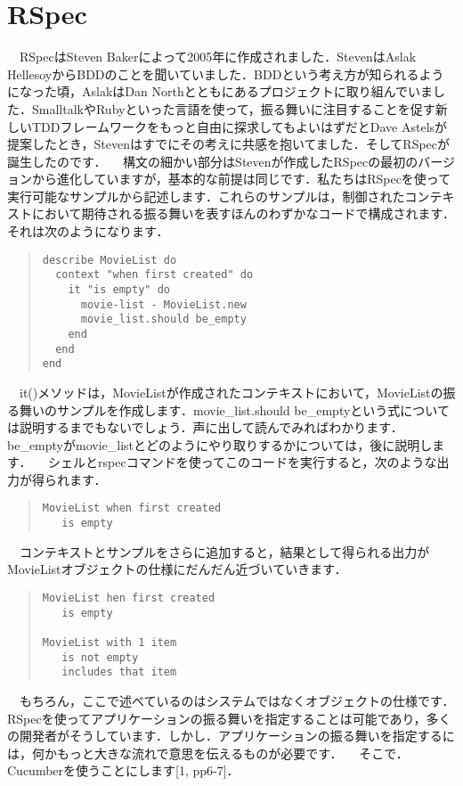 \section{RSpec}
　RSpecはSteven Bakerによって2005年に作成されました．StevenはAslak HellesoyからBDDのことを聞いていました．BDDという考え方が知られるようになった頃，AslakはDan Northとともにあるプロジェクトに取り組んでいました．SmalltalkやRubyといった言語を使って，振る舞いに注目することを促す新しいTDDフレームワークをもっと自由に探求してもよいはずだとDave Astelsが提案したとき，Stevenはすでにその考えに共感を抱いてました．そしてRSpecが誕生したのです．
　構文の細かい部分はStevenが作成したRSpecの最初のバージョンから進化していますが，基本的な前提は同じです．私たちはRSpecを使って実行可能なサンプルから記述します．これらのサンプルは，制御されたコンテキストにおいて期待される振る舞いを表すほんのわずかなコードで構成されます．
それは次のようになります．
\begin{quote}\begin{verbatim}
describe MovieList do
  context "when first created" do
    it "is empty" do
      movie-list - MovieList.new
      movie_list.should be_empty
    end
  end
end

\end{verbatim}\end{quote}
　it()メソッドは，MovieListが作成されたコンテキストにおいて，MovieListの振る舞いのサンプルを作成します．movie\_list.should be\_emptyという式については説明するまでもないでしょう．声に出して読んでみればわかります．be\_emptyがmovie\_listとどのようにやり取りするかについては，後に説明します．
　シェルとrspecコマンドを使ってこのコードを実行すると，次のような出力が得られます．
\begin{quote}\begin{verbatim}
MovieList when first created
   is empty
\end{verbatim}\end{quote}
　コンテキストとサンプルをさらに追加すると，結果として得られる出力がMovieListオブジェクトの仕様にだんだん近づいていきます．
\begin{quote}\begin{verbatim}
MovieList hen first created
   is empty

MovieList with 1 item
   is not empty
   includes that item

\end{verbatim}\end{quote}
　もちろん，ここで述べているのはシステムではなくオブジェクトの仕様です．RSpecを使ってアプリケーションの振る舞いを指定することは可能であり，多くの開発者がそうしています．しかし．アプリケーションの振る舞いを指定するには，何かもっと大きな流れで意思を伝えるものが必要です．
　そこで．Cucumberを使うことにします[1, pp6-7]．

